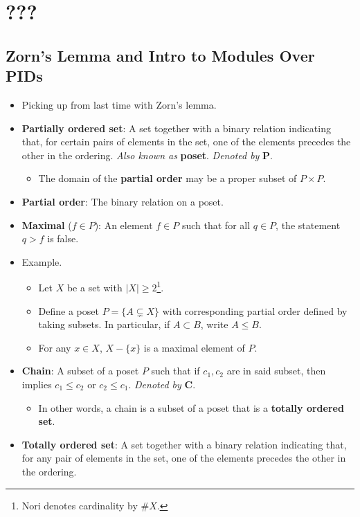 \documentclass[../notes.tex]{subfiles}
\begin{document}
\chapter{???}
\section{Zorn's Lemma and Intro to Modules Over PIDs}
\begin{itemize}
    \item {}Picking up from last time with Zorn's lemma.
    \item \textbf{Partially ordered set}: A set together with a binary relation indicating that, for certain pairs of elements in the set, one of the elements precedes the other in the ordering. \emph{Also known as} \textbf{poset}. \emph{Denoted by} $\bm{P}$.
    \begin{itemize}
        \item The domain of the \textbf{partial order} may be a proper subset of $P\times P$.
    \end{itemize}
    \item \textbf{Partial order}: The binary relation on a poset.
    \item \textbf{Maximal} ($f\in P$): An element $f\in P$ such that for all $q\in P$, the statement $q>f$ is false.
    \item Example.
    \begin{itemize}
        \item Let $X$ be a set with $|X|\geq 2$\footnote{Nori denotes cardinality by $\#X$.}.
        \item Define a poset $P=\{A\subsetneq X\}$ with corresponding partial order defined by taking subsets. In particular, if $A\subset B$, write $A\leq B$.
        \item For any $x\in X$, $X-\{x\}$ is a maximal element of $P$.
    \end{itemize}
    \item \textbf{Chain}: A subset of a poset $P$ such that if $c_1,c_2$ are in said subset, then implies $c_1\leq c_2$ or $c_2\leq c_1$. \emph{Denoted by} $\bm{C}$.
    \begin{itemize}
        \item In other words, a chain is a subset of a poset that is a \textbf{totally ordered set}.
    \end{itemize}
    \item \textbf{Totally ordered set}: A set together with a binary relation indicating that, for any pair of elements in the set, one of the elements precedes the other in the ordering.

\end{itemize}
\end{document}
